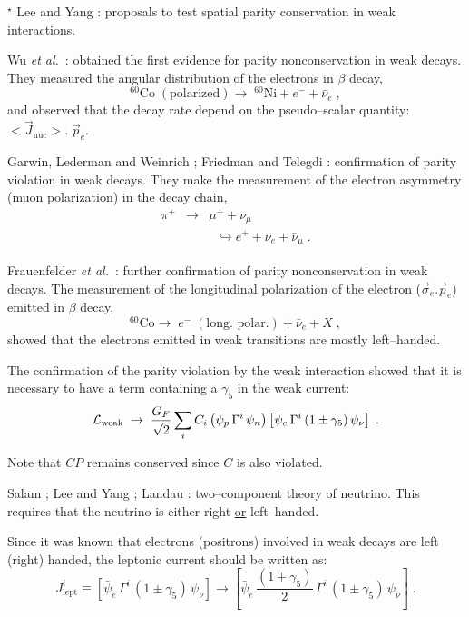 \documentclass[12pt]{report}
\newcommand{\slb}[1]{\textbf{\textsl{#1}}}
\newcommand{\nin}{\noindent}
\def\text#1{{\scriptstyle\mathrm{#1}}}
\newcommand{\gc}{\gamma_5}
\newcommand{\lag}{{\cal L}}
\newcommand{\et}{{\it et al.\/}}
\begin{document}

\nin
\fbox{\slb{1956}} $^\star$ Lee and Yang \cite{Lee:56}: proposals to
test spatial parity conservation in weak interactions.

\nin
\fbox{\slb{1957}} Wu \et\ \cite{Wu:57}: obtained the first evidence
for parity nonconservation in weak decays. They measured the angular
distribution of the electrons in $\beta$ decay,
\[
^{60}\mbox{Co} \; (\mbox{polarized}) \to \; 
^{60}\mbox{Ni} + e^- + \bar{\nu}_e \; ,
\]
and observed that the decay rate depend on the pseudo--scalar
quantity: $<\vec{J}_{\text{nuc}}> . \; \vec{p}_e$.

\nin
\fbox{\slb{1957}} Garwin, Lederman and Weinrich \cite{Garwin:57};
Friedman and Telegdi \cite{Friedman:57}: confirmation of parity
violation in weak decays. They make the measurement of the electron
asymmetry (muon polarization) in the decay chain, 
\begin{eqnarray*}
\pi^+  & \to & \mu^+  + \nu_\mu \\
       && \;\; \hookrightarrow e^+ + \nu_e + \bar{\nu}_\mu \; .
\end{eqnarray*}

\nin
\fbox{\slb{1957}} Frauenfelder \et\ \cite{Frauenfelder:57}: further
confirmation of parity nonconservation in weak decays. The
measurement of the longitudinal polarization of the electron
($\vec{\sigma}_e . \vec{p}_e$) emitted in $\beta$ decay,
\[
^{60}\mbox{Co} \to \; e^- \; (\mbox{long.\ polar.}) + \bar{\nu}_e + X
\; , 
\]
showed that the electrons emitted in weak transitions are mostly
left--handed.

The confirmation of the parity violation by the weak interaction
showed that it is necessary to have a term containing a $\gc$ in the
weak current: 
\[
\lag_{\text{weak}} \; \to \; \frac{G_F}{\sqrt{2}}
\sum_i C_i \left( \bar{\psi}_p \, \Gamma^i \, \psi_n \right)
\left[ \bar{\psi}_e \, \Gamma^i \, (1 \pm \gc) \, \psi_\nu \right] 
\; .
\]

Note that $CP$ remains conserved since $C$ is also violated.


\nin
\fbox{\slb{1957}} Salam \cite{Salam:57} ; Lee and Yang
\cite{Lee:57a}; Landau \cite{Landau:57}: two--component theory of
neutrino. This requires that the neutrino is either right
\underline{or} left--handed. 

Since it was known that electrons (positrons) involved in weak
decays are left (right) handed, the leptonic current should be written
as:
\[
J^i_{\text{lept}} \equiv 
\left[ \bar{\psi}_e \, \Gamma^i \, (1 \pm \gc) \, \psi_\nu \right] \to 
\left[ \bar{\psi}_e \, \frac{(1 + \gc)}{2} \, \Gamma^i \, (1 \pm \gc) \, 
\psi_\nu \right] \; .
\]
\end{document}
